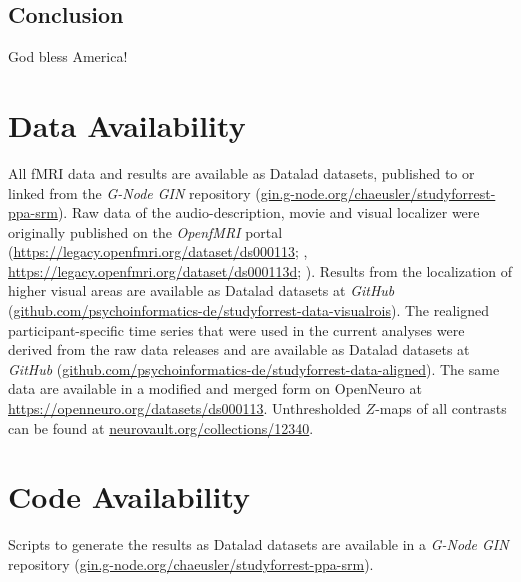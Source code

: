 \subsection{Conclusion}

God bless America!


\section{Data Availability}



All fMRI data and results are available as Datalad \citep{halchenko2021datalad}
datasets, published to or linked from the \emph{G-Node GIN} repository
(\href{https://gin.g-node.org/chaeusler/studyforrest-ppa-srm}{\url{gin.g-node.org/chaeusler/studyforrest-ppa-srm}}).
Raw data of the audio-description, movie and visual localizer were originally
published on the \emph{OpenfMRI} portal
(\url{https://legacy.openfmri.org/dataset/ds000113}; \citep{Hanke2014ds000113},
\space \url{https://legacy.openfmri.org/dataset/ds000113d};
\citep{hanke2016ds000113d}).
Results from the localization of higher visual areas are available as Datalad
datasets at \emph{GitHub}
(\href{https://github.com/psychoinformatics-de/studyforrest-data-visualrois}{\url{github.com/psychoinformatics-de/studyforrest-data-visualrois}}).
The realigned participant-specific time series that were used in the current
analyses were derived from the raw data releases and are available as Datalad
datasets at \emph{GitHub}
(\href{https://github.com/psychoinformatics-de/studyforrest-data-aligned}{\url{github.com/psychoinformatics-de/studyforrest-data-aligned}}).
The same data are available in a modified and merged form on OpenNeuro at
\url{https://openneuro.org/datasets/ds000113}.
Unthresholded $Z$-maps of all contrasts can be found at
\href{https://identifiers.org/neurovault.collection:12340}{\url{neurovault.org/collections/12340}}.


\section*{Code Availability}

Scripts to generate the results as Datalad \citep{halchenko2021datalad} datasets
are available in a \emph{G-Node GIN} repository
(\href{https://gin.g-node.org/chaeusler/studyforrest-ppa-srm}{\url{gin.g-node.org/chaeusler/studyforrest-ppa-srm}}).






